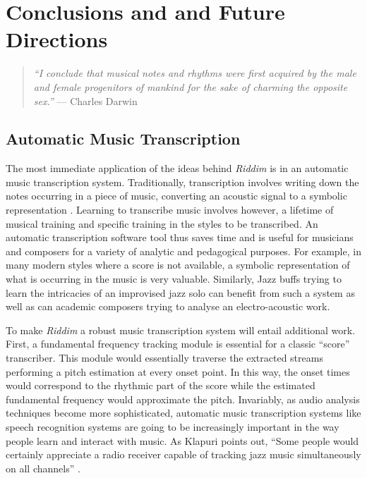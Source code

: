 \chapter{Conclusions and and Future Directions} 
\vspace{10mm}

\begin{quote}
  {\it ``I conclude that musical notes and rhythms were first acquired
    by the male and female progenitors of mankind for the sake of
    charming the opposite sex.''} --- Charles Darwin
\end{quote}


\vspace{7mm}
\section{Automatic Music Transcription}
\vspace{5mm}

The most immediate application of the ideas behind {\it Riddim}
is in an automatic music transcription system.  Traditionally, 
transcription involves writing down the notes occurring in a
piece of music, converting an acoustic signal to a symbolic
representation \cite{Klapuri:98}. Learning to 
transcribe music involves however, a lifetime of musical training
and specific training in the styles to be transcribed. An
automatic transcription software tool thus saves time 
and is useful for musicians and composers for a variety of 
analytic and pedagogical purposes. For example, in many modern styles 
where a score is not available, a symbolic representation of what is 
occurring in the music is very valuable. Similarly, Jazz buffs trying 
to learn the intricacies of an improvised jazz solo can benefit from 
such a system as well as can academic composers trying to analyse an 
electro-acoustic work.

To make {\it Riddim} a robust music transcription system will 
entail additional work. First, a fundamental frequency 
tracking module is essential for a classic ``score'' transcriber. 
This module would essentially traverse the extracted streams 
performing a pitch estimation at every onset point. In this
way, the onset times would correspond to the rhythmic part
of the score while the estimated fundamental frequency would
approximate the pitch. Invariably, as audio analysis techniques become more sophisticated,
automatic music transcription systems like speech recognition
systems are going to be increasingly important in the way people
learn and interact with music. As Klapuri points out, ``Some people
would certainly appreciate a radio receiver capable of tracking
jazz music simultaneously on all channels'' \cite{Klapuri:98}.

